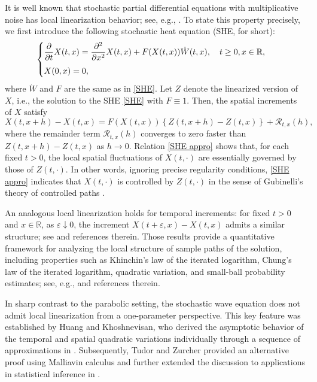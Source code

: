 \documentclass[11pt,reqno]{amsart}
\numberwithin{equation}{section}
\newcommand{\1}{{\bf 1}}
\newcommand{\2}{{\bf 2}}
\begin{document}
 
 It is well known that   stochastic partial differential  equations with multiplicative noise has  local linearization behavior; see, e.g.,  \cite{FKM2015, HP15}.   To state this property precisely, we first introduce the following stochastic heat equation   (SHE, for short):
        \begin{equation}\label{SHE}
\begin{cases}
\vspace{6pt}
\displaystyle{\frac{\partial}{\partial t} X(t, x) =\frac{\partial^2}{\partial x^2} X(t, x) +   F(X(t,x)) \dot{W}(t, x), \quad t \ge 0, x \in \mathbb{R},}\\
\displaystyle{X(0, x) = 0,}
\end{cases}
\end{equation} 
where  $\dot W$ and  $F$ are the same as in \eqref{SHE}.  Let   $Z$ denote the linearized version of $X$, i.e.,    the solution to the   SHE \eqref{SHE} with $F\equiv1$. Then,  the spatial increments of $X$ satisfy 
  \begin{equation}\label{SHE appro}
  X(t, x + h) - X(t, x) = F(X(t, x)) \left\{Z(t, x + h) - Z(t, x)\right\} +  \mathcal R_{t, x}(h),
\end{equation}  
where  the remainder term $\mathcal R_{t, x}(h)$ converges to zero   faster than $Z(t, x + h) -Z(t, x)$   as $h\to 0$.   Relation \eqref{SHE appro} shows that, for each fixed $t>0$, the  local spatial  fluctuations  of    $X(t, \cdot)$ are essentially governed by those of  $Z(t, \cdot)$.   In other words,  ignoring precise regularity conditions,   \eqref{SHE appro} indicates  that $X(t, \cdot)$ is controlled by $Z(t, \cdot)$ in the sense of Gubinelli's theory of  controlled paths     \cite{G04}.  
  
  An analogous local linearization holds   for  temporal increments: for fixed $t>0$ and $x\in \mathbb R$, as $\varepsilon \downarrow 0$, the increment  $X(t+\varepsilon, x)-X(t, x)$ admits a similar structure; see \cite{KSXZ2013, HP15, WX2024, QWWX2025} and references therein. Those results provide a   quantitative framework for analyzing the local   structure   of   sample paths  of the solution, including properties such as  Khinchin's law of the iterated logarithm,  Chung's  law of the iterated logarithm,    quadratic variation, and  small-ball probability estimates; see, e.g.,  \cite{CHKK19, DNP2025, Das2024,  HK2017,  HL2025, KKM23, KLPX25} and references therein.   
 
 In sharp contrast to the parabolic setting,  the stochastic wave equation does not admit local linearization from a one-parameter perspective. This key feature was established by Huang and Khoshnevisan, who derived the asymptotic behavior of   the temporal and spatial quadratic variations individually through a sequence of approximations in \cite{HK2016}. Subsequently, Tudor and Zurcher provided an alternative proof using Malliavin calculus and further extended the discussion to applications in statistical inference in \cite{TZ2025}.
  
\end{document}
